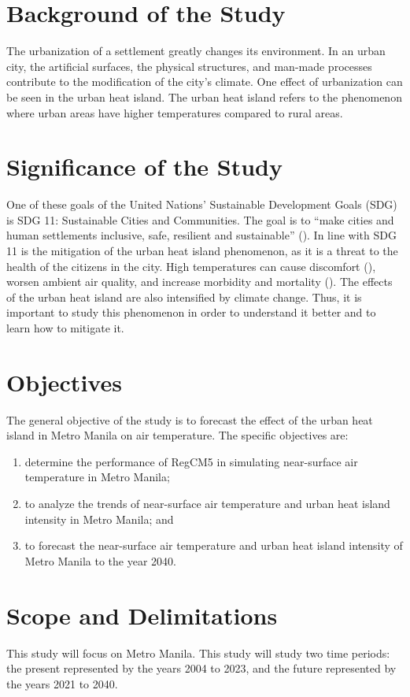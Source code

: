 \section{Background of the Study}
	The urbanization of a settlement greatly changes its environment.
	In an urban city, the artificial surfaces, the physical structures, and man-made processes contribute to the modification of the city's climate.
	One effect of urbanization can be seen in the urban heat island.
	The urban heat island refers to the phenomenon where urban areas have higher temperatures compared to rural areas.
	
\section{Significance of the Study}
	One of these goals of the United Nations' Sustainable Development Goals (SDG) is SDG 11: Sustainable Cities and Communities.
	The goal is to ``make cities and human settlements inclusive, safe, resilient and sustainable'' (\cite{UN2015}).
	In line with SDG 11 is the mitigation of the urban heat island phenomenon, as it is a threat to the health of the citizens in the city.
	High temperatures can cause discomfort (\cite{Bhati2018}), worsen ambient air quality, and increase morbidity and mortality (\cite {Khan2021}).
	The effects of the urban heat island are also intensified by climate change.
	Thus, it is important to study this phenomenon in order to understand it better and to learn how to mitigate it.	

\section{Objectives}
	The general objective of the study is to forecast the effect of the urban heat island in Metro Manila on air temperature.
	The specific objectives are:
	\begin{enumerate}
		\item determine the performance of RegCM5 in simulating near-surface air temperature in Metro Manila;
		\item to analyze the trends of near-surface air temperature and urban heat island intensity in Metro Manila; and
		\item to forecast the near-surface air temperature and urban heat island intensity of Metro Manila to the year 2040.
		
	\end{enumerate}
	

\section{Scope and Delimitations}
	This study will focus on Metro Manila.
	This study will study two time periods: 
		the present represented by the years 2004 to 2023, 
		and the future represented by the years 2021 to 2040.
	
